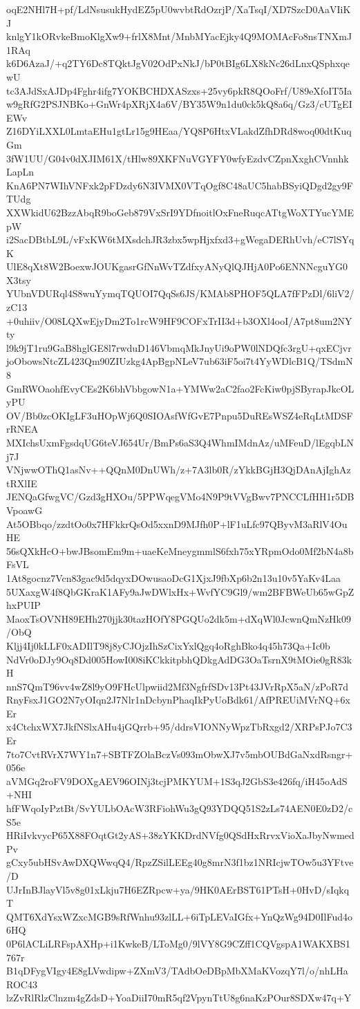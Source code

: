 oqE2NHl7H+pf/LdNsusukHydEZ5pU0wvbtRdOzrjP/XaTsqI/XD7SzcD0AaVIiKJ
knlgY1kORvkeBmoKlgXw9+frlX8Mnt/MnbMYacEjky4Q9MOMAcFo8nsTNXmJ1RAq
k6D6AzaJ/+q2TY6Dc8TQktJgV02OdPxNkJ/bP0tBIg6LX8kNc26dLnxQSphxqewU
tc3AJdSxAJDp4Fghr4ifg7YOKBCHDXASzxs+25vy6pkR8QOoFrf/U89eXfoIT5Ia
w9gRfG2PSJNBKo+GnWr4pXRjX4a6V/BY35W9n1du0ck5kQ8a6q/Gz3/cUTgEIEWv
Z16DYiLXXL0LmtaEHu1gtLr15g9HEaa/YQ8P6HtxVLakdZfhDRd8woq00dtKuqGm
3fW1UU/G04v0dXJIM61X/tHlw89XKFNuVGYFY0wfyEzdvCZpnXxghCVnnhkLapLn
KnA6PN7WIhVNFxk2pFDzdy6N3IVMX0VTqOgf8C48aUC5habBSyiQDgd2gy9FTUdg
XXWkidU62BzzAbqR9boGeb879VxSrI9YDfnoitlOxFneRuqcATtgWoXTYucYMEpW
i2SacDBtbL9L/vFxKW6tMXsdchJR3zbx5wpHjxfxd3+gWegaDERhUvh/eC7lSYqK
UlE8qXt8W2BoexwJOUKgasrGfNnWvTZdfxyANyQlQJHjA0Po6ENNNcguYG0X3tsy
YUbnVDURql4S8wuYymqTQUOI7QqSs6JS/KMAb8PHOF5QLA7fFPzDl/6liV2/zC13
+0uhiiv/O08LQXwEjyDm2To1rcW9HF9COFxTrII3d+b3OXl4ooI/A7pt8um2NYty
l9k9jT1ru9GaB8hglGE8l7rwduD146VbmqMkJnyUi9oPW0lNDQfc3rgU+qxECjvr
joObowsNtcZL423Qm90ZIUzkg4ApBgpNLeV7ub63iF5oi7t4YyWDlcB1Q/TSdmN8
GmRWOaohfEvyCEs2K6bhVbbgowN1a+YMWw2aC2fao2FcKiw0pjSByrapJkcOLyPU
OV/Bb0zcOKIgLF3uHOpWj6Q0SIOAsfWfGvE7Pnpu5DuREsWSZ4eRqLtMDSFrRNEA
MXIchsUxmFgsdqUG6teVJ654Ur/BmPs6aS3Q4WhmIMdnAz/uMFeuD/lEgqbLNj7J
VNjwwOThQ1asNv++QQnM0DnUWh/z+7A3lb0R/zYkkBGjH3QjDAnAjIghAztRXlIE
JENQaGfwgVC/Gzd3gHXOu/5PPWqegVMo4N9P9tVVgBwv7PNCCLfHH1r5DBVpoawG
At5OBbqo/zzdtOo0x7HFkkrQsOd5xxnD9MJfh0P+lF1uLfc97QByvM3aRlV4OuHE
56sQXkHcO+bwJBsomEm9m+uaeKeMneygmmlS6fxh75xYRpmOdo0Mf2bN4a8bFsVL
1At8gocnz7Vcn83gac9d5dqyxDOwusaoDcG1XjxJ9fbXp6b2n13u10v5YaKv4Laa
5UXaxgW4f8QbGKraK1AFy9aJwDWlxHx+WvfYC9Gl9/wm2BFBWeUb65wGpZhxPUIP
MaoxTsOVNH89EHh270jjk30tazHOfY8PGQUo2dk5m+dXqWl0JcwnQmNzHk09/ObQ
Kljj4Ij0kLLF0xADIlT98j8yCJOjzIhSzCixYxlQgq4oRghBko4q45h73Qa+Ic0b
NdVr0oDJy9Oq8Dd005HowI008iKCkkitpbhQDkgAdDG3OaTsrnX9tMOie0gR83kH
nnS7QmT96vv4wZ8l9yO9FHcUlpwiid2Mf3NgfrfSDv13Pt43JVrRpX5aN/zPoR7d
RnyFsxJ1GO2N7yOIqn2J7Nlr1nDcbynPhaqIkPyUoBdk61/AfPREUiMVrNQ+6xEr
x4CtchxWX7JkfNSlxAHu4jGQrrb+95/ddrsVIONNyWpzTbRxgd2/XRPsPJo7C3Er
7to7CvtRVrX7WY1n7+SBTFZOlaBczVs093mObwXJ7v5mbOUBdGaNxdRsngr+056e
aVMGq2roFV9DOXgAEV96OINj3tcjPMKYUM+1S3qJ2GbS3e426fq/iH45oAdS+NHI
hfFWqoIyPztBt/SvYULbOAcW3RFiohWu3gQ93YDQQ51S2zLs74AEN0E0zD2/cS5e
HRiIvkvycP65X88FOqtGt2yAS+38zYKKDrdNVfg0QSdHxRrvxVioXaJbyNwmedPv
gCxy5ubHSvAwDXQWwqQ4/RpzZSilLEEg40g8mrN3f1bz1NRIcjwTOw5u3YFtve/D
UJrInBJlayVl5v8g01xLkju7H6EZRpcw+ya/9HK0AErBST61PTsH+0HvD/sIqkqT
QMT6XdYsxWZxcMGB9sRfWnhu93zlLL+6iTpLEVaIGfx+YnQzWg94D0IlFud4o6HQ
0P6lACLiLRFspAXHp+i1KwkeB/LToMg0/9lVY8G9CZff1CQVgspA1WAKXBS1767r
B1qDFygVIgy4E8gLVwdipw+ZXmV3/TAdbOeDBpMbXMaKVozqY7l/o/nhLHaROC43
lzZvRlRlzClnzm4gZdsD+YoaDiiI70mR5qf2VpynTtU8g6naKzPOur8SDXw47q+Y
